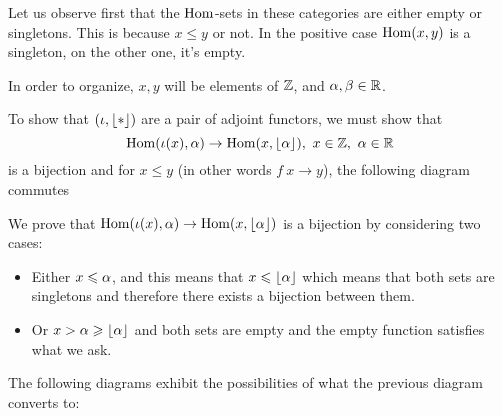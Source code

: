 \documentclass[12pt]{memoir}
\begin{document}
\begin{ptcbr}
    Let us observe first that the $\Hom$-sets in these categories are either empty or singletons. This is because $x\leq y$ or not. In the positive case $\Hom(x,y)$ is a singleton, on the other one, it's empty.\par 
    In order to organize, $x,y$ will be elements of $\bZ$, and $\al,\bt\in\bR$.\par 
    To show that $(\iota,\floor{\ast})$ are a pair of adjoint functors, we must show that
    $$\Hom(\iota(x),\al)\to\Hom(x,\floor{\al}),\ x\in\bZ,\ \al\in\bR$$
    is a bijection and for $x\leq y$ (in other words $f\: x\to y$), the following diagram commutes
    \begin{center}
    \end{center}
    We prove that $\Hom(\iota(x),\al)\to\Hom(x,\floor{\al})$ is a bijection by considering two cases:
    \begin{itemize}
        \item Either $x\leq \al$, and this means that $x\leq\floor{\al}$ which means that both sets are singletons and therefore there exists a bijection between them.
        \item Or $x>\al\geq\floor{\al}$ and both sets are empty and the empty function satisfies what we ask.
    \end{itemize}
    The following diagrams exhibit the possibilities of what the previous diagram converts to:
    \begin{center}
\begin{tikzcd}

\end{tikzcd}
\end{center}
\end{ptcbr}
\end{document}
